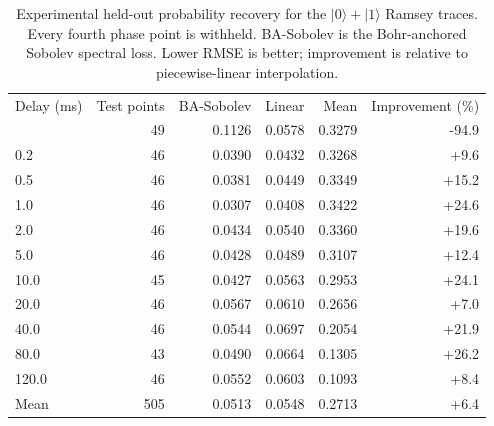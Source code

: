 \begin{table}[t]
\centering
\caption{Experimental held-out probability recovery for the $\lvert0\rangle+\lvert1\rangle$ Ramsey traces. Every fourth phase point is withheld. BA-Sobolev is the Bohr-anchored Sobolev spectral loss. Lower RMSE is better; improvement is relative to piecewise-linear interpolation.}\label{tab:real_accuracy}
\begin{ruledtabular}\begin{tabular}{lrrrrr}
Delay (ms) & Test points & BA-Sobolev & Linear & Mean & Improvement (\%) \\
\colrule
0.1 & 49 & 0.1126 & 0.0578 & 0.3279 & -94.9 \\
0.2 & 46 & 0.0390 & 0.0432 & 0.3268 & +9.6 \\
0.5 & 46 & 0.0381 & 0.0449 & 0.3349 & +15.2 \\
1.0 & 46 & 0.0307 & 0.0408 & 0.3422 & +24.6 \\
2.0 & 46 & 0.0434 & 0.0540 & 0.3360 & +19.6 \\
5.0 & 46 & 0.0428 & 0.0489 & 0.3107 & +12.4 \\
10.0 & 45 & 0.0427 & 0.0563 & 0.2953 & +24.1 \\
20.0 & 46 & 0.0567 & 0.0610 & 0.2656 & +7.0 \\
40.0 & 46 & 0.0544 & 0.0697 & 0.2054 & +21.9 \\
80.0 & 43 & 0.0490 & 0.0664 & 0.1305 & +26.2 \\
120.0 & 46 & 0.0552 & 0.0603 & 0.1093 & +8.4 \\
\colrule
Mean & 505 & 0.0513 & 0.0548 & 0.2713 & +6.4 \\
\end{tabular}\end{ruledtabular}
\end{table}
